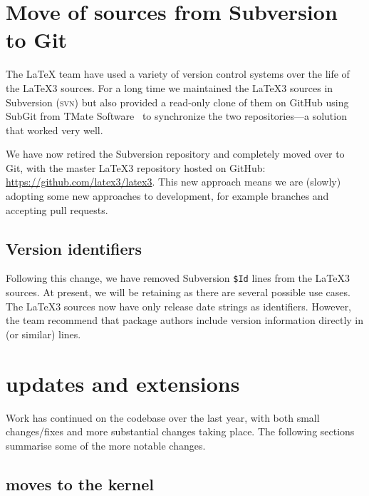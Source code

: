 \documentclass{ltnews}
\begin{document}
\maketitle

\tableofcontents


\section{Move of sources from Subversion to Git}

The \LaTeX{} team have used a variety of version control systems over the life
of the \LaTeX3 sources. For a long time we maintained the \LaTeX3 sources in
Subversion (\textsc{svn}) but also provided a read-only clone of them on GitHub using
SubGit from TMate Software~\cite{SubGit} to synchronize the two
repositories---a solution that worked very well.

We have now retired the Subversion repository and completely moved over to Git,
with the master \LaTeX3 repository hosted on GitHub:
\url{https://github.com/latex3/latex3}. This new approach means we are (slowly)
adopting some new approaches to development, for example branches and accepting
pull requests.

\subsection{Version identifiers}

Following this change, we have removed Subversion \verb=$Id= lines from the
\LaTeX3 sources. At present, we will be retaining  as there are
several possible use cases. The \LaTeX3 sources now have only release date
strings as identifiers. However, the team recommend that package authors
include version information directly in  (or similar)
lines.

\section{ updates and extensions}

Work has continued on the codebase over the last year, with both small
changes/fixes and more substantial changes taking place. The following sections
summarise some of the more notable changes.

\subsection{ moves to the kernel}
\end{document}
